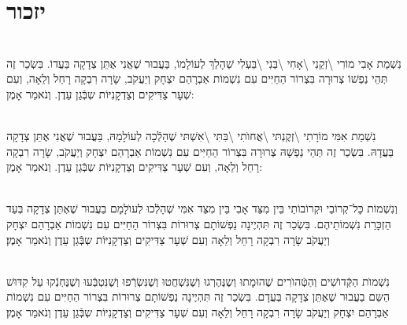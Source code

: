 \documentclass[twoside, openany, parskip=half, 11pt]{book}
\begin{document}
 \vfill
{}


\sepline



\chapter[יזכור]{ יזכור }
 
 
 
\\
 נִשְׁמַת אָבִי מוֹרִי \textbackslash  זְקֵנִי \textbackslash אָחִי \textbackslash בְּנִי \textbackslash בַּעְלִי   שְׁהָלַךְ לְעוֹלָמוֹ, בַּעֲבוּר שֶׁאֲנִי אֶתֵּן צְדָקָה בַּעֲדוֹ. בִּשְׂכַר זֶה תְּהֵי נַפְשׁוֹ צְרוּרָה בִּצְרוֹר הַחַיִּים עִם נִשְׁמוֹת אַבְרָהַם יִצְחָק וְיַעֲקֹב, שָׂרָה רִבְקָה רָחֵל וְלֵאָה, וְעִם שְׁעָר צַדִּיקִים וְצַדְקָנִיּוֹת שְבְּֿגַן עֵדֶן. וְנֹאמַר אָמֶן:

 \\
 נִשְׁמַת אִמִּי מוֹרָתִי \textbackslash  זְקֶנְתּי \textbackslash אֲחוׂתִי \textbackslash בִּתִּי \textbackslash אִשְׁתּי 
 שֶׁהָלְֿכָה לְעוֹלָמָהּ, בַּעֲבוּר שֶׁאֲנִי אֶתֵּן צְדָקָה בַּעֲדָהּ. בִּשְׂכַר זֶה תְּהֵי נַפְשָׁהּ צְרוּרָה בִּצְרוֹר הַחַיִּים עִם נִשְׁמוֹת אַבְרָהַם יִצְחָק וְיַעֲקֹב, שָׂרָה רִבְקָה רָחֵל וְלֵאָה, וְעִם שְׁעָר צַדִּיקִים וְצַדְקָנִיּוֹת שְבְּֿגַן עֵדֶן. וְנֹאמַר אָמֶן:

 \\
 וְנִשְׁמוֹת כָּל־קְרוֹבַי וּקְרוֹבוֹתַי בֵּין מִצַּד אָבִי בֵּין מִצַּד אִמִּי 
 שְׁהָלְֿכוּ לְעוׂלָמָם
  בַעֲבוּר שֶׁאֶתֵּן צְדָקָה בְּעַד הַזְכָּרַת נִשְׁמוֹתֵיהֶם. בִּשְׂכַר זֶה תִּהְיֶינָה נַפְשׁוֹתָם צְרוּרוֹת בִּצְרוֹר הַחַיִּים עִם נִשְׁמוֹת אַבְרָהַם יִצְחָק וְיַעֲקֹב שָׂרָה רִבְקָה רָחֵל וְלֵאָה וְעִם שְׁעָר צַדִּיקִים וְצַדְקָנִיּוֹת שְבְּֿגַן עֵדֶן וְנֹאמַר אָמֶן׃



\\
 נִשְׁמוׂת הַקְּֿדוׂשִׁים וְהַטְּֿהוׂרִים
  שֶׁהוּמָתוּ וְשֶנֶּהֶרְגוּ וְשֶׁנִּשְׁחֲטוּ וְשֶׁנִּשְׂרְֿפוּ וְשֶׁנִּטְבְּֿעוּ וְשֶׁנֶּחְנְֿקוּ עַל קִדּוּשׁ הַשֵּם בַעֲבוּר שֶׁאֶתֵּן צְדָקָה בְּעֲדָם. בִּשְׂכַר זֶה תִּהְיֶינָה נַפְשׁוֹתָם צְרוּרוֹת בִּצְרוֹר הַחַיִּים עִם נִשְׁמוֹת אַבְרָהַם יִצְחָק וְיַעֲקֹב שָׂרָה רִבְקָה רָחֵל וְלֵאָה וְעִם שְׁעָר צַדִּיקִים וְצַדְקָנִיּוֹת שְבְּֿגַן עֵדֶן וְנֹאמַר אָמֶן׃
  
\end{document}
